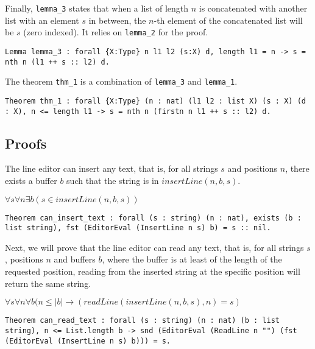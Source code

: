\documentclass{article}
\theoremstyle{definition}
\begin{document}
Finally, \texttt{lemma\_3} states that when a list of length \(n\) is concatenated with another list with an element \(s\) in between, the \(n\)-th element of the concatenated list will be \(s\) (zero indexed). It relies on \texttt{lemma\_2} for the proof.

\begin{lstlisting}
Lemma lemma_3 : forall {X:Type} n l1 l2 (s:X) d, length l1 = n -> s = nth n (l1 ++ s :: l2) d.
\end{lstlisting}

The theorem \texttt{thm\_1} is a combination of \texttt{lemma\_3} and \texttt{lemma\_1}.

\begin{lstlisting}
Theorem thm_1 : forall {X:Type} (n : nat) (l1 l2 : list X) (s : X) (d : X), n <= length l1 -> s = nth n (firstn n l1 ++ s :: l2) d.
\end{lstlisting}

\subsection{Proofs}

The line editor can insert any text, that is, for all strings \(s\) and positions \(n\), there exists a buffer \(b\) such that the string is in \(insertLine( n, b, s )\).

\begin{center}
\(\forall s \forall n \exists b (s \in insertLine( n, b, s ))\)
\end{center}

\begin{lstlisting}
Theorem can_insert_text : forall (s : string) (n : nat), exists (b : list string), fst (EditorEval (InsertLine n s) b) = s :: nil.
\end{lstlisting}

Next, we will prove that the line editor can read any text, that is, for all strings \(s\), positions \(n\) and buffers \(b\), where the buffer is at least of the length of the requested position, reading from the inserted string at the specific position will return the same string.

\begin{center}
\(\forall s \forall n \forall b (n \leq |b| \to (readLine(insertLine( n, b, s ), n) = s)\)
\end{center}

\begin{lstlisting}
Theorem can_read_text : forall (s : string) (n : nat) (b : list string), n <= List.length b -> snd (EditorEval (ReadLine n "") (fst (EditorEval (InsertLine n s) b))) = s.
\end{lstlisting}
\end{document}
